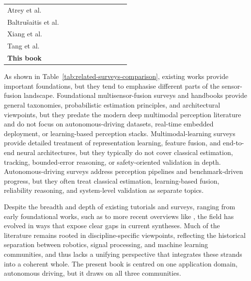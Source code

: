 \documentclass[graybox,envcountchap]{style/SNmono}
\newcommand{\cmark}{\textcolor{MarkerGreen}{\ding{51}}}
\newcommand{\pmark}{\textcolor{MarkerOrange}{\ding{108}}}
\newcommand{\xmark}{\textcolor{red}{\ding{55}}}
\begin{document}
\begin{table}[!t]
{\begin{tabular}{p{}ccccccccc}
        Atrey et al.~\cite{atrey_multimodal_2010} &
        \pmark & \pmark & \pmark & \xmark & \cmark & \xmark & \pmark & \xmark & \pmark \\

        Baltru\v{s}aitis et al.~\cite{baltrusaitis_multimodal_2019} &
        \pmark & \xmark & \pmark & \xmark & \cmark & \pmark & \pmark & \xmark & \pmark \\

        Xiang et al.~\cite{2023:IEEE_ITSM} &
        \pmark & \pmark & \pmark & \xmark & \cmark & \cmark & \cmark & \pmark & \pmark \\

        Tang et al.~\cite{TANG2023109165} &
        \pmark & \pmark & \pmark & \xmark & \cmark & \cmark & \cmark & \pmark & \pmark \\

        \textbf{This book} &
        \cmark & \cmark & \cmark & \cmark & \cmark & \cmark & \cmark & \pmark & \cmark \\
        \hline
    \end{tabular}
    }

    
    
    
\end{table}
As shown in Table~\ref{tab:related-surveys-comparison}, existing works provide important foundations, but they tend to emphasise different parts of the sensor-fusion landscape. Foundational multisensor-fusion surveys and handbooks provide general taxonomies, probabilistic estimation principles, and architectural viewpoints, but they predate the modern deep multimodal perception literature and do not focus on autonomous-driving datasets, real-time embedded deployment, or learning-based perception stacks. Multimodal-learning surveys provide detailed treatment of representation learning, feature fusion, and end-to-end neural architectures, but they typically do not cover classical estimation, tracking, bounded-error reasoning, or safety-oriented validation in depth. Autonomous-driving surveys address perception pipelines and benchmark-driven progress, but they often treat classical estimation, learning-based fusion, reliability reasoning, and system-level validation as separate topics.

Despite the breadth and depth of existing tutorials and surveys, ranging from early foundational works, such as \cite{luo_multisensor_1989, hall_introduction_1997, liggins_handbook_2009, khaleghi_multisensor_2013} to more recent overviews like \cite{baltrusaitis_multimodal_2019, 2023:IEEE_ITSM,TANG2023109165}, the field has evolved in ways that expose clear gaps in current syntheses. Much of the literature remains rooted in discipline-specific viewpoints, reflecting the historical separation between robotics, signal processing, and machine learning communities, and thus lacks a unifying perspective that integrates these strands into a coherent whole. The present book is centred on one application domain, autonomous driving, but it draws on all three communities.
\end{document}
